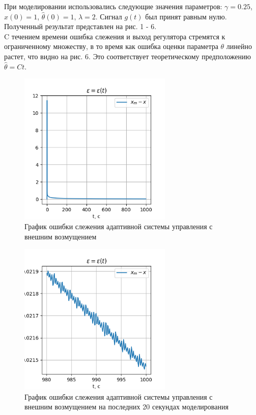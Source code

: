 \documentclass{article}
\begin{document}
При моделировании использовались следующие значения параметров: $\gamma = 0.25$, $x(0) = 1$, $\hat \theta(0) = 1$, $\lambda = 2$. Сигнал $g(t)$ был принят равным нулю. Полученный результат представлен на рис. {1 - 6}. \\
C течением времени ошибка слежения и выход регулятора стремятся к ограниченному множеству, в то время как ошибка оценки параметра $\theta$ линейно растет, что видно на рис. 6. Это соответствует теоретическому предположению $\hat \theta = Ct$.

\begin{figure}[h!]
  \centering
  \includegraphics[width=0.65\textwidth]{figs/1_epsilon.png}
  \caption{График ошибки слежения адаптивной системы управления с внешним возмущением} 
  \label{fig:task1_y}
\end{figure}

\begin{figure}[h!]
  \centering
  \includegraphics[width=0.65\textwidth]{figs/1_epsilon_small.png}
  \caption{График ошибки слежения адаптивной системы управления с внешним возмущением на последних 20 секундах моделирования} 
  \label{fig:task1_y}
\end{figure}
\end{document}
